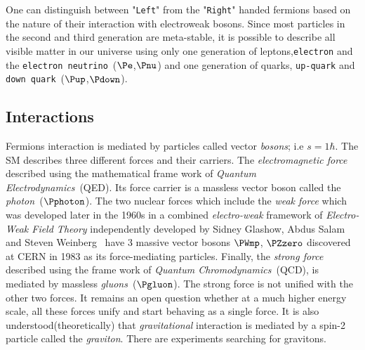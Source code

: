 One can distinguish between "\texttt{Left}" from the  "\texttt{Right}" handed fermions based on the nature of their interaction with electroweak bosons.  
Since most particles in the second and third generation are meta-stable, it is possible to describe all visible matter in our universe using only one generation of leptons,\texttt{electron} and the \texttt{electron neutrino}~($\Pe$,$\Pnu$) and one generation of quarks, \texttt{up-quark} and \texttt{down quark}~($\Pup$,$\Pdown$). 
 
\subsection*{Interactions}
Fermions interaction is mediated by particles called vector \textit{bosons}; i.e $s=1\hbar$. The SM describes three different forces and their carriers. The \textit{electromagnetic force} described using the mathematical frame work of \textit{Quantum Electrodynamics}~(QED). Its force carrier is a massless vector boson called the \textit{photon}~($\Pphoton$). The two nuclear forces which include the \textit{weak force} which was developed later in the 1960s in a combined \textit{electro-weak} framework of \textit{Electro-Weak Field Theory} independently developed by Sidney Glashow, Abdus Salam and Steven Weinberg~\cite{SWG} have 3 massive vector bosons $\PWmp$, $\PZzero$ discovered at CERN in 1983 as its force-mediating particles. Finally, the \textit{strong force} described using the frame work of \textit{Quantum Chromodynamics}~(QCD), is mediated by massless \textit{gluons}~($\Pgluon$). The strong force is not unified with the other two forces.  It remains an open question whether at a much higher energy scale, all these forces unify and start behaving as a single force. It is also understood(theoretically) that \textit{gravitational} interaction is mediated by a spin-2 particle called the \textit{graviton}. There are experiments searching for gravitons.



